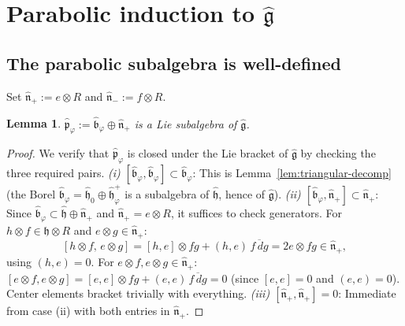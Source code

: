 \documentclass{amsart}
\newcommand{\g}{\mathfrak{g}}
\newcommand{\h}{\mathfrak{h}}
\newcommand{\wh}[1]{\widehat{#1}}
\newcommand{\whg}{\wh{\g}}
\newcommand{\whh}{\wh{\h}}
\newcommand{\ol}{\overline}
\newtheorem{lemma}[theorem]{Lemma}
\theoremstyle{definition}
\theoremstyle{remark}
\numberwithin{equation}{section}
\begin{document}
\section{Parabolic induction to $\whg$}\label{sec:parabolic}
\subsection{The parabolic subalgebra is well-defined}
Set $\wh{\mathfrak n}_+:=e\otimes R$ and $\wh{\mathfrak n}_-:=f\otimes R$.
\begin{lemma}\label{lem:parabolic-subalg}
$\wh{\mathfrak p}_\varphi:=\wh{\mathfrak b}_\varphi\oplus\wh{\mathfrak n}_+$
is a Lie subalgebra of $\whg$.
\end{lemma}
\begin{proof}
We verify that $\wh{\mathfrak p}_\varphi$ is closed under the Lie bracket
of $\whg$ by checking the three required pairs.
\emph{(i) $[\wh{\mathfrak b}_\varphi,\wh{\mathfrak b}_\varphi]\subset
\wh{\mathfrak b}_\varphi$}: This is Lemma~\ref{lem:triangular-decomp}
(the Borel $\wh{\mathfrak b}_\varphi=\whh_0\oplus\whh_\varphi^+$ is a
subalgebra of $\whh$, hence of $\whg$).
\emph{(ii) $[\wh{\mathfrak b}_\varphi,\wh{\mathfrak n}_+]\subset
\wh{\mathfrak n}_+$}: Since $\wh{\mathfrak b}_\varphi\subset\whh\oplus
\wh{\mathfrak n}_+$ and $\wh{\mathfrak n}_+=e\otimes R$, it suffices to check
generators.  For $h\otimes f\in\h\otimes R$ and $e\otimes g\in\wh{\mathfrak n}_+$:
\[
[h\otimes f,\,e\otimes g]=[h,e]\otimes fg+(h,e)\,\ol{f\,dg}
=2e\otimes fg\in\wh{\mathfrak n}_+,
\]
using $(h,e)=0$.  For $e\otimes f,e\otimes g\in\wh{\mathfrak n}_+$:
$[e\otimes f,e\otimes g]=[e,e]\otimes fg+(e,e)\,\ol{f\,dg}=0$
(since $[e,e]=0$ and $(e,e)=0$).  Center elements bracket trivially with
everything.
\emph{(iii) $[\wh{\mathfrak n}_+,\wh{\mathfrak n}_+]=0$}: Immediate from
case (ii) with both entries in $\wh{\mathfrak n}_+$.
\end{proof}
\end{document}
